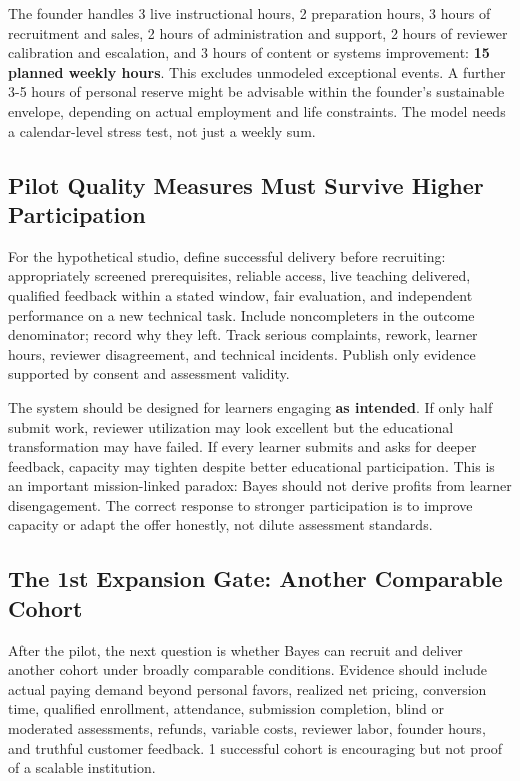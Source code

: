 The founder handles 3 live instructional hours, 2 preparation hours, 3 hours of recruitment and sales, 2 hours of administration and support, 2 hours of reviewer calibration and escalation, and 3 hours of content or systems improvement: \textbf{15 planned weekly hours}. This excludes unmodeled exceptional events. A further 3-5 hours of personal reserve might be advisable within the founder's sustainable envelope, depending on actual employment and life constraints. The model needs a calendar-level stress test, not just a weekly sum.

\subsection{Pilot Quality Measures Must Survive Higher Participation}
\label{sec:pilot_quality_measures_participation}

For the hypothetical studio, define successful delivery before recruiting: appropriately screened prerequisites, reliable access, live teaching delivered, qualified feedback within a stated window, fair evaluation, and independent performance on a new technical task. Include noncompleters in the outcome denominator; record why they left. Track serious complaints, rework, learner hours, reviewer disagreement, and technical incidents. Publish only evidence supported by consent and assessment validity.

The system should be designed for learners engaging \textbf{as intended}. If only half submit work, reviewer utilization may look excellent but the educational transformation may have failed. If every learner submits and asks for deeper feedback, capacity may tighten despite better educational participation. This is an important mission-linked paradox: Bayes should not derive profits from learner disengagement. The correct response to stronger participation is to improve capacity or adapt the offer honestly, not dilute assessment standards.

\subsection{The 1st Expansion Gate: Another Comparable Cohort}
\label{sec:first_expansion_gate_comparable_cohort}

After the pilot, the next question is whether Bayes can recruit and deliver another cohort under broadly comparable conditions. Evidence should include actual paying demand beyond personal favors, realized net pricing, conversion time, qualified enrollment, attendance, submission completion, blind or moderated assessments, refunds, variable costs, reviewer labor, founder hours, and truthful customer feedback. 1 successful cohort is encouraging but not proof of a scalable institution.

